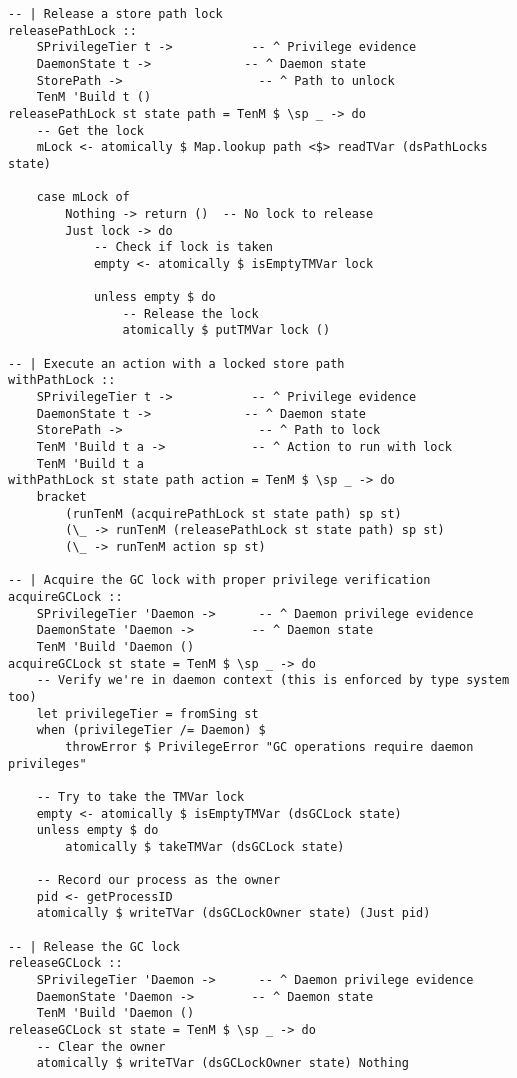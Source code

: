 \documentclass{article}
\begin{document}
\begin{tcolorbox}[title=Ten/Daemon/State.hs Changes]
\begin{verbatim}
-- | Release a store path lock
releasePathLock ::
    SPrivilegeTier t ->           -- ^ Privilege evidence
    DaemonState t ->             -- ^ Daemon state
    StorePath ->                   -- ^ Path to unlock
    TenM 'Build t ()
releasePathLock st state path = TenM $ \sp _ -> do
    -- Get the lock
    mLock <- atomically $ Map.lookup path <$> readTVar (dsPathLocks state)

    case mLock of
        Nothing -> return ()  -- No lock to release
        Just lock -> do
            -- Check if lock is taken
            empty <- atomically $ isEmptyTMVar lock

            unless empty $ do
                -- Release the lock
                atomically $ putTMVar lock ()

-- | Execute an action with a locked store path
withPathLock ::
    SPrivilegeTier t ->           -- ^ Privilege evidence
    DaemonState t ->             -- ^ Daemon state
    StorePath ->                   -- ^ Path to lock
    TenM 'Build t a ->            -- ^ Action to run with lock
    TenM 'Build t a
withPathLock st state path action = TenM $ \sp _ -> do
    bracket
        (runTenM (acquirePathLock st state path) sp st)
        (\_ -> runTenM (releasePathLock st state path) sp st)
        (\_ -> runTenM action sp st)

-- | Acquire the GC lock with proper privilege verification
acquireGCLock ::
    SPrivilegeTier 'Daemon ->      -- ^ Daemon privilege evidence
    DaemonState 'Daemon ->        -- ^ Daemon state
    TenM 'Build 'Daemon ()
acquireGCLock st state = TenM $ \sp _ -> do
    -- Verify we're in daemon context (this is enforced by type system too)
    let privilegeTier = fromSing st
    when (privilegeTier /= Daemon) $
        throwError $ PrivilegeError "GC operations require daemon privileges"

    -- Try to take the TMVar lock
    empty <- atomically $ isEmptyTMVar (dsGCLock state)
    unless empty $ do
        atomically $ takeTMVar (dsGCLock state)

    -- Record our process as the owner
    pid <- getProcessID
    atomically $ writeTVar (dsGCLockOwner state) (Just pid)

-- | Release the GC lock
releaseGCLock ::
    SPrivilegeTier 'Daemon ->      -- ^ Daemon privilege evidence
    DaemonState 'Daemon ->        -- ^ Daemon state
    TenM 'Build 'Daemon ()
releaseGCLock st state = TenM $ \sp _ -> do
    -- Clear the owner
    atomically $ writeTVar (dsGCLockOwner state) Nothing


\end{verbatim}
\end{tcolorbox}
\end{document}
